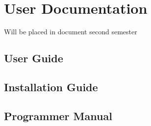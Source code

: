 
\chapter{User Documentation}
 Will be placed in document second semester


\section{User Guide}



\section{Installation Guide}


\section{Programmer Manual}

